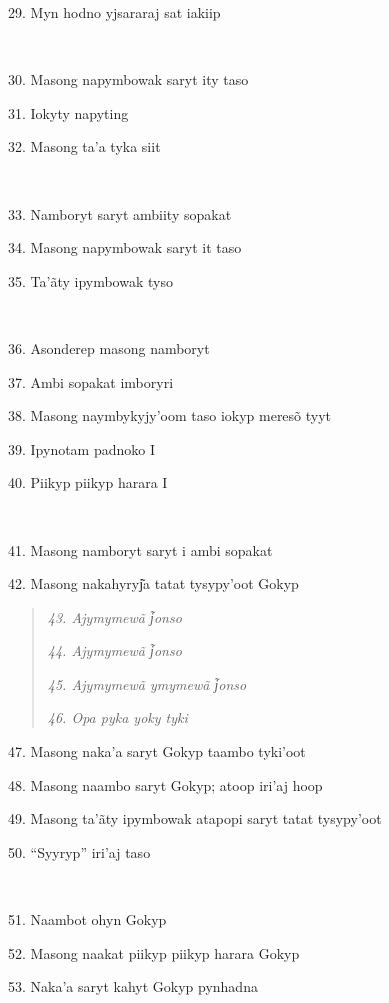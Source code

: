29. Myn hodno yjsararaj sat iakiip

~

30. Masong napymbowak saryt ity taso

31. Iokyty napyting

32. Masong ta'a tyka siit

~

33. Namboryt saryt ambiity sopakat

34. Masong napymbowak saryt it taso

35. Ta'ãty ipymbowak tyso

~

36. Asonderep masong namboryt

37. Ambi sopakat imboryri

38. Masong naymbykyjy'oom taso iokyp meresõ tyyt

39. Ipynotam padnoko I

40. Piikyp piikyp harara I

~

41. Masong namboryt saryt i ambi sopakat

42. Masong nakahyryj͂a tatat tysypy'oot Gokyp

\begin{quote}
\forceindent\emph{43. Ajymymewã j͂onso}

\emph{44. Ajymymewã j͂onso}

\emph{45. Ajymymewã ymymewã j͂onso}

\emph{46. Opa pyka yoky tyki}
\end{quote}

47. Masong naka'a saryt Gokyp taambo tyki'oot

48. Masong naambo saryt Gokyp; atoop iri'aj hoop

49. Masong ta'ãty ipymbowak atapopi saryt tatat tysypy'oot

50. ``Syyryp'' iri'aj taso

~

51. Naambot ohyn Gokyp

52. Masong naakat piikyp piikyp harara Gokyp

53. Naka'a saryt kahyt Gokyp pynhadna